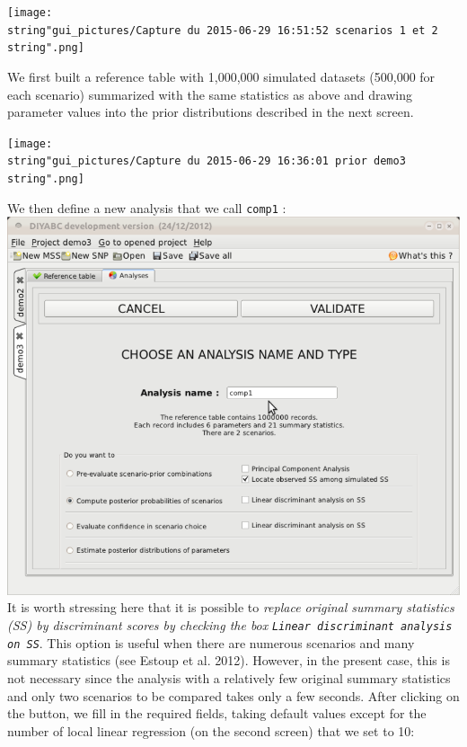 \texttt{[image: \\string"gui\_pictures/Capture du 2015-06-29 16:51:52 scenarios 1 et 2\\string".png]}

We first built a reference table with 1,000,000 simulated datasets
(500,000 for each scenario) summarized with the same statistics as
above and drawing parameter values into the prior distributions described
in the next screen.

\texttt{[image: \\string"gui\_pictures/Capture du 2015-06-29 16:36:01 prior demo3\\string".png]}

We then define a new analysis that we call \texttt{comp1} :\\


\includegraphics[scale=0.33]{gui_pictures/Capture-DIYABC-105} \\


It is worth stressing here that it is possible to \emph{replace original
summary statistics (SS) by discriminant scores by checking the box
}\texttt{\emph{Linear discriminant analysis on SS}}. This option is
useful when there are numerous scenarios and many summary statistics
(see Estoup et al. 2012). However, in the present case, this is not
necessary since the analysis with a relatively few original summary
statistics and only two scenarios to be compared takes only a few
seconds. After clicking on the  button,
we fill in the required fields, taking default values except for the
number of local linear regression (on the second screen) that we set
to 10:\\


